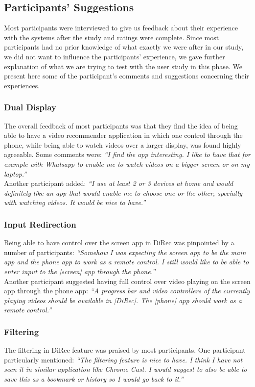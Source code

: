 \subsection{Participants' Suggestions}
Most participants were interviewed to give us feedback about their experience
with the systems after the study and ratings were complete. Since most
participants had no prior knowledge of what exactly we were after in our study,
we did not want to influence the participants' experience, we gave further
explanation of what we are trying to test with the user study in this phase. We
present here some of the participant's comments and suggestions concerning their
experiences.
\subsubsection{Dual Display}
The overall feedback of most participants was that they find the idea of being
able to have a video recommender application in which one control through the
phone, while being able to watch videos over a larger display, was found highly
agreeable. Some comments were: \textit{``I find the app interesting. I like to
have that for example with Whatsapp to enable me to watch videos on a bigger screen or on my laptop.''}\\
Another participant added: \textit{``I use at least 2 or 3 devices at home and
would definitely like an app that would enable me to choose one or the other, specially with watching videos. It
would be nice to have.''}  
\subsubsection{Input Redirection}
Being able to have control over the screen app in DiRec was pinpointed by a
number of participants: \textit{``Somehow I was expecting the screen app to be
the main app and the phone app to work as a remote control. I still would like to be able to
enter input to the [screen] app through the phone.''}\\
Another participant suggested having full control over video playing on the
screen app through the phone app: \textit{``A progress bar and video controllers
of the currently playing videos should be available in [DiRec]. The [phone] app should work as a remote
control.''}
\subsubsection{Filtering}
The filtering in DiRec feature was praised by most participants. One participant
particularly mentioned: \textit{``The filtering feature is nice to have. I think
I have not seen it in similar application like Chrome Cast. I would suggest to also be able to save this as
a bookmark or history so I would go back to it.''}
